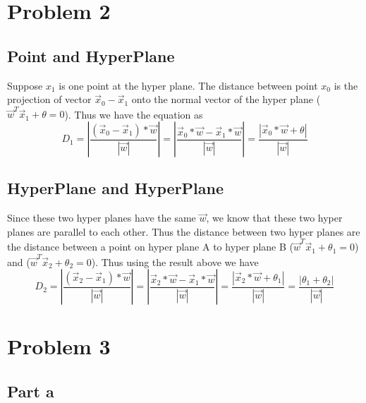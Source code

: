 \section{Problem 2}
\subsection{Point and HyperPlane}
Suppose $x_1$ is one point at the hyper plane. The distance between point $x_0$ is the projection of vector $\vec{x}_0-\vec{x}_1$ onto the normal vector of the hyper plane ($\vec{w}^T\vec{x}_1+\theta=0$). Thus we have the equation as 
\begin{equation*}
D_1=|\frac{(\vec{x}_0-\vec{x}_1)*\vec{w}}{|\vec{w}|}|=|\frac{\vec{x}_0*\vec{w}-\vec{x}_1*\vec{w}}{|\vec{w}|}|=\frac{|\vec{x}_0*\vec{w}+\theta|}{|\vec{w}|}
\end{equation*}

\subsection{HyperPlane and HyperPlane}
Since these two hyper planes have the same $\vec{w}$, we know that these two hyper planes are parallel to each other. Thus the distance between two hyper planes are the distance between a point on hyper plane A to hyper plane B ($\vec{w}^T\vec{x}_1+\theta_1=0$) and ($\vec{w}^T\vec{x}_2+\theta_2=0$). Thus using the result above we have 
\begin{equation*}
D_2=|\frac{(\vec{x}_2-\vec{x}_1)*\vec{w}}{|\vec{w}|}|=|\frac{\vec{x}_2*\vec{w}-\vec{x}_1*\vec{w}}{|\vec{w}|}|=\frac{|\vec{x}_2*\vec{w}+\theta_1|}{|\vec{w}|}=\frac{|\theta_1+\theta_2|}{|\vec{w}|}
\end{equation*}

\section{Problem 3}
\subsection{Part a}
